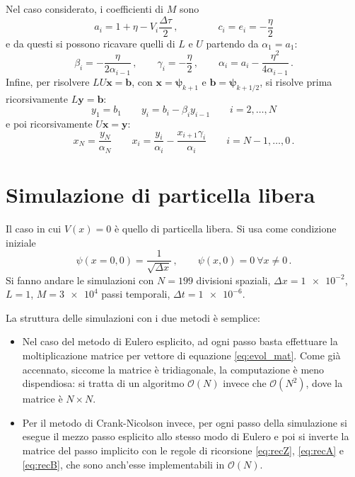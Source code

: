 \documentclass[a4paper, titlepage]{article}
\numberwithin{equation}{section}
\begin{document}
Nel caso considerato, i coefficienti di $M$ sono
\begin{equation*}
    a_i = 1 + \eta - V_i \frac{\Delta\tau}{2}\, , \qquad\qquad
    c_i = e_i = -\frac{\eta}{2}
\end{equation*}
e da questi si possono ricavare quelli di $L$ e $U$ partendo da $\alpha_1 = a_1$:
\begin{equation}
    \beta_i = -\frac{\eta}{2\alpha_{i-1}}\, ,
    \qquad
    \gamma_i = -\frac{\eta}{2}\, ,
    \qquad
    \alpha_i = a_i - \frac{\eta^2}{4\alpha_{i-1}}\, .
    \label{eq:recZ}
\end{equation}
Infine, per risolvere $LU\mathbf{x} = \mathbf{b}$, con $\mathbf{x} = \bm{\psi}_{k+1}$ e $\mathbf{b} = \bm{\psi}_{k+1/2}$, si risolve prima ricorsivamente $L\mathbf{y} = \mathbf{b}$:
\begin{equation}
    y_1 = b_1 \qquad y_i = b_i -\beta_i y_{i-1} \qquad i = 2,\dots,N
    \label{eq:recA}
\end{equation}
e poi ricorsivamente $U\mathbf{x} = \mathbf{y}$:
\begin{equation}
    x_N = \frac{y_N}{\alpha_N} \qquad x_i = \frac{y_i}{\alpha_i} - \frac{x_{i+1}\gamma_i}{\alpha_i} \qquad i = N-1,\dots,0\, .
    \label{eq:recB}
\end{equation}

\section{Simulazione di particella libera}
Il caso in cui $V(x) = 0$ è quello di particella libera. Si usa come condizione iniziale
\begin{equation}
    \psi(x = 0, 0) = \frac{1}{\sqrt{\Delta x}}\, ,
    \qquad
    \psi(x,0) = 0\ \forall x \neq 0\, .
    \label{eq:initial}
\end{equation}
Si fanno andare le simulazioni con $N = 199$ divisioni spaziali, $\Delta x = \num{1e-2}$, $L=1$, $M = \num{3e4}$ passi temporali, $\Delta t = \num{1e-6}$. 

La struttura delle simulazioni con i due metodi è semplice:
\begin{itemize}
    \item Nel caso del metodo di Eulero esplicito, ad ogni passo basta effettuare la moltiplicazione matrice per vettore di equazione \eqref{eq:evol_mat}. Come già accennato, siccome la matrice è tridiagonale, la computazione è meno dispendiosa: si tratta di un algoritmo $\mathcal{O}(N)$ invece che $\mathcal{O}(N^2)$, dove la matrice è $N\times N$.
    \item Per il metodo di Crank-Nicolson invece, per ogni passo della simulazione si esegue il mezzo passo esplicito allo stesso modo di Eulero e poi si inverte la matrice del passo implicito con le regole di ricorsione \eqref{eq:recZ}, \eqref{eq:recA} e \eqref{eq:recB}, che sono anch'esse implementabili in $\mathcal{O}(N)$.
\end{itemize}
\end{document}
